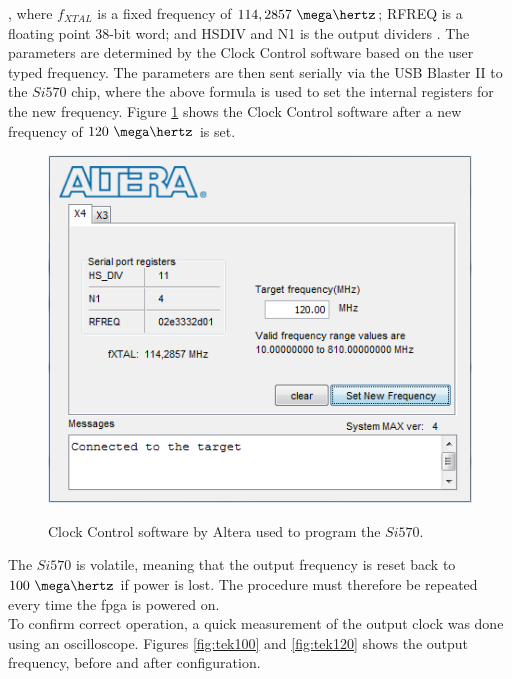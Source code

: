 \documentclass[main.tex]{subfiles}
\begin{document}
, where $f_{XTAL}$ is a fixed frequency of $114,2857~\mega\hertz$; RFREQ is a floating point 38-bit word; and HSDIV and N1 is the output dividers \cite{si570}. The parameters are determined by the Clock Control software based on the user typed frequency. The parameters are then sent serially via the USB Blaster II to the $Si570$ chip, where the above formula is used to set the internal registers for the new frequency.
Figure \ref{fig:clk_cont120} shows the Clock Control software after a new frequency of $120~\mega\hertz$ is set. 

\begin{figure}[] %
\begin{center}
\includegraphics[scale=1]{../img/clk_cont120}  \\[0.1 cm]
\caption{Clock Control software by Altera used to program the $Si570$.}
\label{fig:clk_cont120}
\end{center}
\end{figure} 

The $Si570$ is volatile, meaning that the output frequency is reset back to $100~\mega\hertz$ if power is lost. The procedure must therefore be repeated every time the \gls{fpga} is powered on.\\
To confirm correct operation, a quick measurement of the output clock was done using an oscilloscope. Figures \ref{fig:tek100} and \ref{fig:tek120} shows the output frequency, before and after configuration.\\
\end{document}
